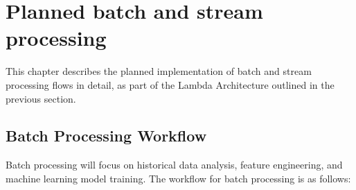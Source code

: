 \documentclass[12pt,a4paper, hidelinks]{article}
\begin{document}

\section{Planned batch and stream processing}

This chapter describes the planned implementation of batch and stream processing flows in detail, as part of the Lambda Architecture outlined in the previous section.

\subsection{Batch Processing Workflow}
Batch processing will focus on historical data analysis, feature engineering, and machine learning model training. The workflow for batch processing is as follows:
\end{document}
